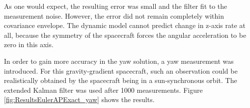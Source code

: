 \documentclass[]{aiaa-tc}%
\begin{document}
As one would expect, the resulting error was small and the filter fit to the measurement noise. However, the error did not remain completely within covariance envelope. The dynamic model cannot predict change in z-axis rate at all, because the symmetry of the spacecraft forces the angular acceleration to be zero in this axis. 

	\vspace{5 mm}

In order to gain more accuracy in the yaw solution, a yaw measurement was introduced. For this gravity-gradient spacecraft, such an observation could be realistically obtained by the spacecraft being in a sun-synchronous orbit. The extended Kalman filter was used after 1000 measurements. Figure \ref{fig:ResultsEulerAPExact_yaw} shows the results.
	\begin{figure}[H]
		\centering
\end{figure}
\end{document}
